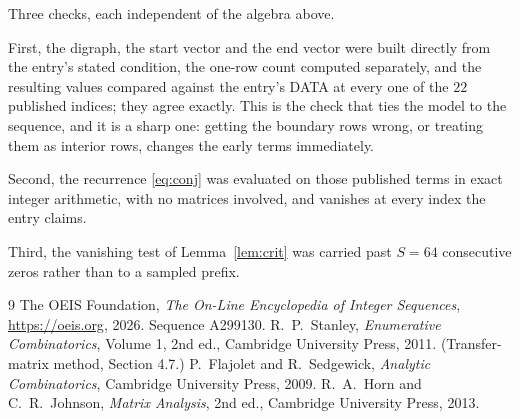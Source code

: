\documentclass[11pt,a4paper]{article}
\theoremstyle{plain}
\theoremstyle{definition}
\begin{document}
Three checks, each independent of the algebra above.

First, the digraph, the start vector and the end vector were built directly from the
entry's stated condition, the one-row count computed separately, and the resulting values
compared against the entry's DATA at every one of the $22$ published indices; they
agree exactly. This is the check that ties the model to the sequence, and it is a sharp one:
getting the boundary rows wrong, or treating them as interior rows, changes the early terms
immediately.

Second, the recurrence \eqref{eq:conj} was evaluated on those published terms in exact
integer arithmetic, with no matrices involved, and vanishes at every index the entry claims.

Third, the vanishing test of Lemma~\ref{lem:crit} was carried past $S=64$ consecutive
zeros rather than to a sampled prefix.

\begin{thebibliography}{9}
 The OEIS Foundation, \emph{The On-Line Encyclopedia of Integer
Sequences}, \url{https://oeis.org}, 2026. Sequence A299130.
 R.~P.~Stanley, \emph{Enumerative Combinatorics}, Volume 1, 2nd ed.,
Cambridge University Press, 2011. (Transfer-matrix method, Section 4.7.)
 P.~Flajolet and R.~Sedgewick, \emph{Analytic Combinatorics}, Cambridge
University Press, 2009.
 R.~A.~Horn and C.~R.~Johnson, \emph{Matrix Analysis}, 2nd ed., Cambridge
University Press, 2013.
\end{thebibliography}
\end{document}
